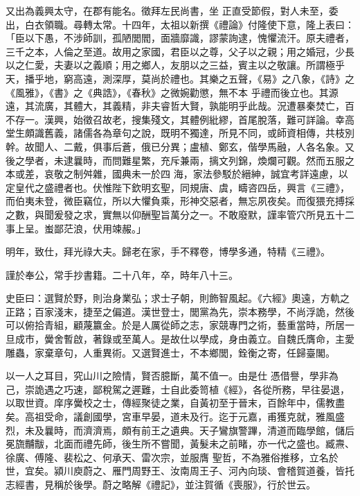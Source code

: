 \begin{pinyinscope}
 又出為義興太守，在郡有能名。徵拜左民尚書，坐
 正直受節假，對人未至，委出，白衣領職。尋轉太常。十四年，太祖以新撰《禮論》付隆使下意，隆上表曰：「臣以下愚，不涉師訓，孤陋閭閻，面牆靡識，謬蒙詢逮，愧懼流汗。原夫禮者，三千之本，人倫之至道。故用之家國，君臣以之尊，父子以之親；用之婚冠，少長以之仁愛，夫妻以之義順；用之鄉人，友朋以之三益，賓主以之敬讓。所謂極乎天，播乎地，窮高遠，測深厚，莫尚於禮也。其樂之五聲，《易》之八象，《詩》之《風雅》，《書》之《典誥》，《春秋》之微婉勸懲，無不本
 乎禮而後立也。其源遠，其流廣，其體大，其義精，非夫睿哲大賢，孰能明乎此哉。況遭暴秦焚亡，百不存一。漢興，始徵召故老，搜集殘文，其體例紕繆，首尾脫落，難可詳論。幸高堂生頗識舊義，諸儒各為章句之說，既明不獨達，所見不同，或師資相傳，共枝別幹。故聞人、二戴，俱事后蒼，俄已分異；盧植、鄭玄，偕學馬融，人各名象。又後之學者，未逮曩時，而問難星繁，充斥兼兩，摛文列錦，煥爛可觀。然而五服之本或差，哀敬之制舛雜，國典未一於四
 海，家法參駁於縉紳，誠宜考詳遠慮，以定皇代之盛禮者也。伏惟陛下欽明玄聖，同規唐、虞，疇咨四岳，興言《三禮》，而伯夷未登，微臣竊位，所以大懼負乘，形神交惡者，無忘夙夜矣。而復猥充搏採之數，與聞爰發之求，實無以仰酬聖旨萬分之一。不敢廢默，謹率管穴所見五十二事上呈。蚩鄙茫浪，伏用竦赧。」



 明年，致仕，拜光祿大夫。歸老在家，手不釋卷，博學多通，特精《三禮》。



 謹於奉公，常手抄書籍。二十八年，卒，時年八十三。



 史臣曰：選賢於野，則治身業弘；求士子朝，則飾智風起。《六經》奧遠，方軌之正路；百家淺末，捷至之偏道。漢世登士，閭黨為先，崇本務學，不尚浮詭，然後可以俯拾青組，顧蔑籝金。於是人厲從師之志，家競專門之術，藝重當時，所居一旦成市，黌舍暫啟，著錄或至萬人。是故仕以學成，身由義立。自魏氏膺命，主愛雕蟲，家棄章句，人重異術。又選賢進士，不本鄉閭，銓衡之寄，任歸臺閣。



 以一人之耳目，究山川之險情，賢否臆斷，萬不值一。由是仕
 憑借譽，學非為己，崇詭遇之巧速，鄙稅駕之遲難，士自此委笥植《經》，各從所務，早往晏退，以取世資。庠序黌校之士，傳經聚徒之業，自黃初至于晉末，百餘年中，儒教盡矣。高祖受命，議創國學，宮車早晏，道未及行。迄于元嘉，甫獲克就，雅風盛烈，未及曩時，而濟濟焉，頗有前王之遺典。天子鸞旗警蹕，清道而臨學館，儲后冕旒黼黻，北面而禮先師，後生所不嘗聞，黃髮未之前睹，亦一代之盛也。臧燾、徐廣、傅隆、裴松之、何承天、雷次宗，並服膺
 聖哲，不為雅俗推移，立名於世，宜矣。潁川庾蔚之、雁門周野王、汝南周王子、河內向琰、會稽賀道養，皆托志經書，見稱於後學。蔚之略解《禮記》，並注賀循《喪服》，行於世云。



\end{pinyinscope}